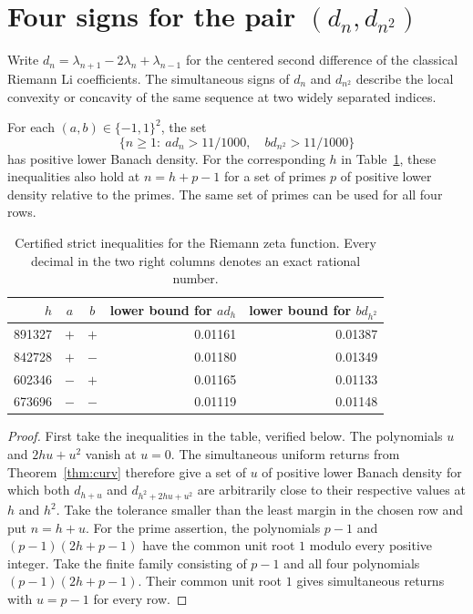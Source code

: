 \section{Four signs for the pair \texorpdfstring{\((d_n,d_{n^2})\)}{of second differences}}
\label{sec:signs}

Write $d_n=\lambda_{n+1}-2\lambda_n+\lambda_{n-1}$ for the centered
second difference of the classical Riemann Li coefficients.
The simultaneous signs of $d_n$ and $d_{n^2}$ describe the local convexity
or concavity of the same sequence at two widely separated indices.

\begin{corollary}\label{cor:signs}
For each $(a,b)\in\{-1,1\}^2$, the set
\[
 \{n\ge1:\ ad_n>11/1000,\quad bd_{n^2}>11/1000\}
\]
has positive lower Banach density. For the corresponding $h$ in
Table~\ref{tab:seeds}, these inequalities also hold at $n=h+p-1$
for a set of primes $p$ of positive lower density relative to the primes.
The same set of primes can be used for all four rows.
\end{corollary}

\begin{table}[ht]
\centering
\begin{tabular}{rcc@{\qquad}rr}
\hline
$h$ & $a$ & $b$ & lower bound for $ad_h$ & lower bound for $bd_{h^2}$\\
\hline
891327 & $+$ & $+$ & 0.01161 & 0.01387\\
842728 & $+$ & $-$ & 0.01180 & 0.01349\\
602346 & $-$ & $+$ & 0.01165 & 0.01133\\
673696 & $-$ & $-$ & 0.01119 & 0.01148\\
\hline
\end{tabular}
\caption{Certified strict inequalities for the Riemann zeta function.
Every decimal in the two right columns denotes an exact rational number.}
\label{tab:seeds}
\end{table}

\begin{proof}
First take the inequalities in the table, verified below. The polynomials
$u$ and $2hu+u^2$ vanish at $u=0$. The simultaneous uniform returns from
Theorem~\ref{thm:curv} therefore give a set of $u$ of positive lower
Banach density for which both $d_{h+u}$ and $d_{h^2+2hu+u^2}$ are arbitrarily
close to their respective values at $h$ and $h^2$. Take the tolerance
smaller than the least margin in the chosen row and put $n=h+u$.
For the prime assertion, the polynomials $p-1$ and
$(p-1)(2h+p-1)$ have the common unit root $1$ modulo every positive
integer. Take the finite family consisting of $p-1$ and all four
polynomials $(p-1)(2h+p-1)$. Their common unit root $1$ gives
simultaneous returns with $u=p-1$ for every row.
\end{proof}

